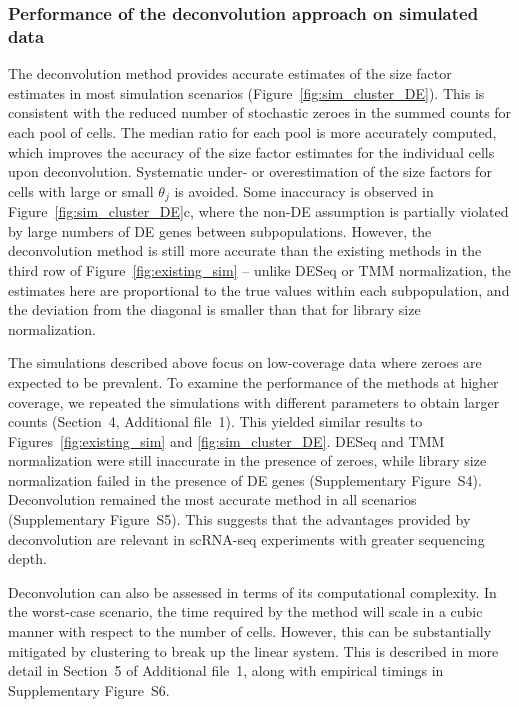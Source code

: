 \documentclass{bmcart}
\newcommand{\supphighcov}{4}
\newcommand{\supptimecomp}{5}
\newcommand{\supphighcovex}{S4}
\newcommand{\supphighcovde}{S5}
\newcommand{\supptimings}{S6}
\newcommand{\revised}[1]{#1}
\begin{document}
\subsubsection*{Performance of the deconvolution approach on simulated data}
The deconvolution method provides accurate estimates of the size factor estimates in most simulation scenarios (Figure~\ref{fig:sim_cluster_DE}).
This is consistent with the reduced number of stochastic zeroes in the summed counts for each \revised{pool} of cells.
The median ratio for each \revised{pool} is more accurately computed, which improves the accuracy of the size factor estimates for the individual cells upon deconvolution.
Systematic under- or overestimation of the size factors for cells with large or small $\theta_j$ is avoided.
Some inaccuracy is observed in Figure~\ref{fig:sim_cluster_DE}c, where the non-DE assumption is partially violated by large numbers of DE genes between subpopulations.
However, the deconvolution method is still more accurate than the existing methods in the third row of Figure~\ref{fig:existing_sim}
    -- unlike DESeq or TMM normalization, the estimates here are proportional to the true values within each subpopulation, 
       and the deviation from the diagonal is smaller than that for library size normalization.

\revised{The simulations described above focus on low-coverage data where zeroes are expected to be prevalent.
To examine the performance of the methods at higher coverage, we repeated the simulations with different parameters to obtain larger counts (Section~\supphighcov{}, Additional file~1).
This yielded similar results to Figures~\ref{fig:existing_sim} and \ref{fig:sim_cluster_DE}.
DESeq and TMM normalization were still inaccurate in the presence of zeroes, while library size normalization failed in the presence of DE genes (Supplementary Figure~\supphighcovex{}). 
Deconvolution remained the most accurate method in all scenarios (Supplementary Figure~\supphighcovde{}).
This suggests that the advantages provided by deconvolution are relevant in scRNA-seq experiments with greater sequencing depth.}

\revised{Deconvolution can also be assessed in terms of its computational complexity.
In the worst-case scenario, the time required by the method will scale in a cubic manner with respect to the number of cells.
However, this can be substantially mitigated by clustering to break up the linear system.
This is described in more detail in Section~\supptimecomp{} of Additional file~1, along with empirical timings in Supplementary Figure~\supptimings{}.}
\end{document}
